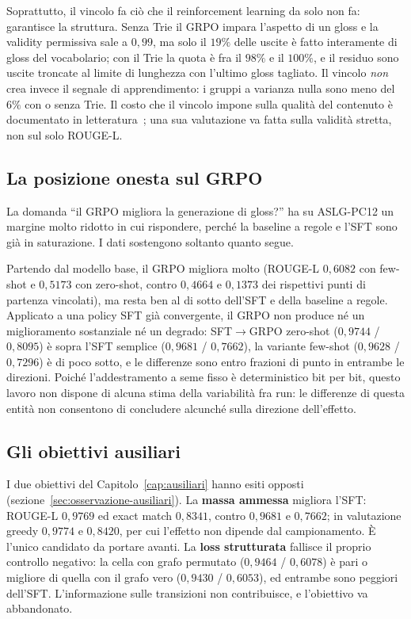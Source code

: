 Soprattutto, il vincolo fa ciò che il reinforcement learning da solo non fa:
garantisce la struttura. Senza Trie il GRPO impara l'aspetto di un gloss e la
validity permissiva sale a $0{,}99$, ma solo il $19\%$ delle uscite è fatto
interamente di gloss del vocabolario; con il Trie la quota è fra il $98\%$ e il
$100\%$, e il residuo sono uscite troncate al limite di lunghezza con l'ultimo
gloss tagliato. Il vincolo \emph{non} crea invece il segnale di
apprendimento: i gruppi a varianza nulla sono meno del $6\%$ con o senza Trie.
Il costo che il vincolo impone sulla qualità del contenuto è documentato in
letteratura~\cite{reddy2603,zhou2604,ye2504}; una sua valutazione va fatta sulla
validità stretta, non sul solo ROUGE-L.

\subsection{La posizione onesta sul GRPO}

La domanda ``il GRPO migliora la generazione di gloss?'' ha su ASLG-PC12 un
margine molto ridotto in cui rispondere, perché la baseline a regole e l'SFT
sono già in saturazione. I dati sostengono soltanto quanto segue.

Partendo dal modello base, il GRPO migliora molto (ROUGE-L $0{,}6082$ con
few-shot e $0{,}5173$ con zero-shot, contro $0{,}4664$ e $0{,}1373$ dei
rispettivi punti di partenza vincolati), ma resta ben al di sotto dell'SFT e
della baseline a regole. Applicato a una policy SFT già convergente, il GRPO non
produce né un miglioramento sostanziale né un degrado: SFT$\to$GRPO zero-shot
($0{,}9744$ / $0{,}8095$) è sopra l'SFT semplice ($0{,}9681$ / $0{,}7662$),
la variante few-shot ($0{,}9628$ / $0{,}7296$) è di poco sotto, e le differenze
sono entro frazioni di punto in entrambe le direzioni. Poiché l'addestramento a
seme fisso è deterministico bit per bit, questo lavoro non dispone di alcuna
stima della variabilità fra run: le differenze di questa entità non consentono
di concludere alcunché sulla direzione dell'effetto.

\subsection{Gli obiettivi ausiliari}

I due obiettivi del Capitolo~\ref{cap:ausiliari} hanno esiti opposti
(sezione~\ref{sec:osservazione-ausiliari}). La \textbf{massa ammessa} migliora
l'SFT: ROUGE-L $0{,}9769$ ed exact match $0{,}8341$, contro $0{,}9681$ e
$0{,}7662$; in valutazione greedy $0{,}9774$ e $0{,}8420$, per cui l'effetto non
dipende dal campionamento. È l'unico candidato da portare avanti. La
\textbf{loss strutturata} fallisce il proprio controllo negativo: la cella con
grafo permutato ($0{,}9464$ / $0{,}6078$) è pari o migliore di quella con il
grafo vero ($0{,}9430$ / $0{,}6053$), ed entrambe sono peggiori dell'SFT.
L'informazione sulle transizioni non contribuisce, e l'obiettivo va abbandonato.

